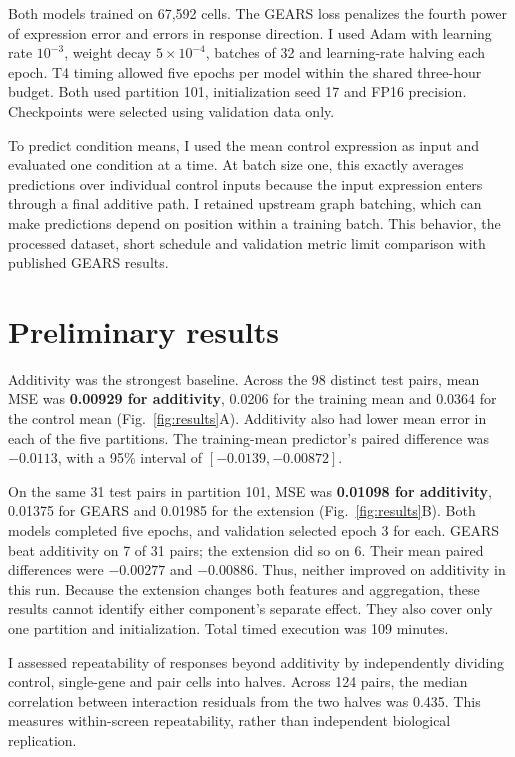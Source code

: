 \documentclass[11pt,letterpaper]{article}
\begin{document}
Both models trained on 67,592 cells. The GEARS loss penalizes the fourth power of expression error and errors in response direction. I used Adam with learning rate $10^{-3}$, weight decay $5\times10^{-4}$, batches of 32 and learning-rate halving each epoch. T4 timing allowed five epochs per model within the shared three-hour budget. Both used partition 101, initialization seed 17 and FP16 precision. Checkpoints were selected using validation data only.

To predict condition means, I used the mean control expression as input and evaluated one condition at a time. At batch size one, this exactly averages predictions over individual control inputs because the input expression enters through a final additive path. I retained upstream graph batching, which can make predictions depend on position within a training batch. This behavior, the processed dataset, short schedule and validation metric limit comparison with published GEARS results.

\section{Preliminary results}
Additivity was the strongest baseline. Across the 98 distinct test pairs, mean MSE was \textbf{0.00929 for additivity}, 0.0206 for the training mean and 0.0364 for the control mean (Fig.~\ref{fig:results}A). Additivity also had lower mean error in each of the five partitions. The training-mean predictor's paired difference was $-0.0113$, with a 95\% interval of $[-0.0139,-0.00872]$.

On the same 31 test pairs in partition 101, MSE was \textbf{0.01098 for additivity}, 0.01375 for GEARS and 0.01985 for the extension (Fig.~\ref{fig:results}B). Both models completed five epochs, and validation selected epoch 3 for each. GEARS beat additivity on 7 of 31 pairs; the extension did so on 6. Their mean paired differences were $-0.00277$ and $-0.00886$. Thus, neither improved on additivity in this run. Because the extension changes both features and aggregation, these results cannot identify either component's separate effect. They also cover only one partition and initialization. Total timed execution was 109 minutes.

I assessed repeatability of responses beyond additivity by independently dividing control, single-gene and pair cells into halves. Across 124 pairs, the median correlation between interaction residuals from the two halves was 0.435. This measures within-screen repeatability, rather than independent biological replication.
\end{document}
